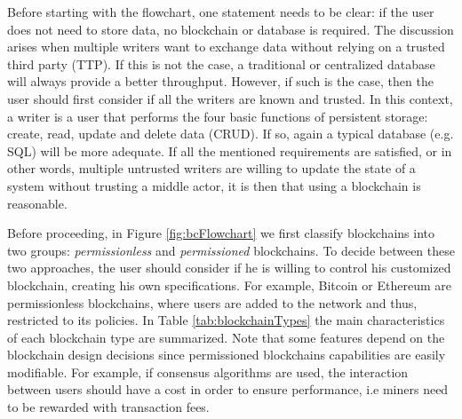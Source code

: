 Before starting with the flowchart, one statement needs to be clear: if the user does not need to store data, no blockchain or database is required. The discussion arises when multiple writers want to exchange data without relying on a trusted third party (TTP). If this is not the case, a traditional or centralized database will always provide a better throughput. However, if such is the case, then the user should first consider if all the writers are known and trusted. In this context, a writer is a user that performs the four basic functions of persistent storage: create, read, update and delete data (CRUD). If so, again a typical database (e.g. SQL) will be more adequate. If all the mentioned requirements are satisfied, or in other words, multiple untrusted writers are willing to update the state of a system without trusting a middle actor, it is then that using a blockchain is reasonable.

Before proceeding, in Figure \ref{fig:bcFlowchart} we first classify blockchains into two groups: \textit{permissionless} and \textit{permissioned} blockchains. To decide between these two approaches, the user should consider if he is willing to control his customized blockchain, creating his own specifications. For example, Bitcoin or Ethereum are permissionless blockchains, where users are added to the network and thus, restricted to its policies. In Table \ref{tab:blockchainTypes} the main characteristics of each blockchain type are summarized. Note that some features depend on the blockchain design decisions since permissioned blockchains capabilities are easily modifiable. For example, if consensus algorithms are used, the interaction between users should have a cost in order to ensure performance, i.e miners need to be rewarded with transaction fees.

